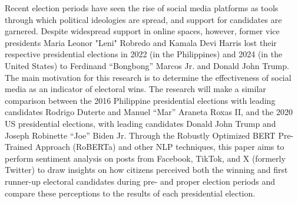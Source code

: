 \begin{thesisabstract}
Recent election periods have seen the rise of social media platforms as tools through which political ideologies are spread, and support for candidates are garnered. Despite widespread support in online spaces, however, former vice presidents Maria Leonor "Leni" Robredo and Kamala Devi Harris lost their respective presidential elections in 2022 (in the Philippines) and 2024 (in the United States) to Ferdinand “Bongbong” Marcos Jr. and Donald John Trump. The main motivation for this research is to determine the effectiveness of social media as an indicator of electoral wins. The research will make a similar comparison between the 2016 Philippine presidential elections with leading candidates Rodrigo Duterte and Manuel “Mar” Araneta Roxas II, and the 2020 US presidential elections, with leading candidates Donald John Trump and Joseph Robinette “Joe” Biden Jr. Through the Robustly Optimized BERT Pre-Trained Approach (RoBERTa) and other NLP techniques, this paper aims to perform sentiment analysis on posts from Facebook, TikTok, and X (formerly Twitter) to draw insights on how citizens perceived both the winning and first runner-up electoral candidates during pre- and proper election periods and compare these perceptions to the results of each presidential election.
\end{thesisabstract}